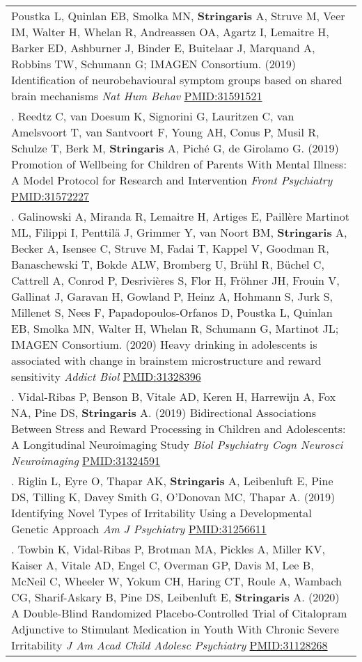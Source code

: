 \documentclass[
]{article}
\begin{document}
\begin{longtable}[]{@{}
  >{\raggedright\arraybackslash}p{}@{}}
Poustka L, Quinlan EB, Smolka MN, \textbf{Stringaris} A, Struve M, Veer
IM, Walter H, Whelan R, Andreassen OA, Agartz I, Lemaitre H, Barker ED,
Ashburner J, Binder E, Buitelaar J, Marquand A, Robbins TW, Schumann G;
IMAGEN Consortium. (2019) Identification of neurobehavioural symptom
groups based on shared brain mechanisms \emph{Nat Hum Behav}
\url{PMID:31591521} \\
81. Reedtz C, van Doesum K, Signorini G, Lauritzen C, van Amelsvoort T,
van Santvoort F, Young AH, Conus P, Musil R, Schulze T, Berk M,
\textbf{Stringaris} A, Piché G, de Girolamo G. (2019) Promotion of
Wellbeing for Children of Parents With Mental Illness: A Model Protocol
for Research and Intervention \emph{Front Psychiatry}
\url{PMID:31572227} \\
82. Galinowski A, Miranda R, Lemaitre H, Artiges E, Paillère Martinot
ML, Filippi I, Penttilä J, Grimmer Y, van Noort BM, \textbf{Stringaris}
A, Becker A, Isensee C, Struve M, Fadai T, Kappel V, Goodman R,
Banaschewski T, Bokde ALW, Bromberg U, Brühl R, Büchel C, Cattrell A,
Conrod P, Desrivières S, Flor H, Fröhner JH, Frouin V, Gallinat J,
Garavan H, Gowland P, Heinz A, Hohmann S, Jurk S, Millenet S, Nees F,
Papadopoulos-Orfanos D, Poustka L, Quinlan EB, Smolka MN, Walter H,
Whelan R, Schumann G, Martinot JL; IMAGEN Consortium. (2020) Heavy
drinking in adolescents is associated with change in brainstem
microstructure and reward sensitivity \emph{Addict Biol}
\url{PMID:31328396} \\
83. Vidal-Ribas P, Benson B, Vitale AD, Keren H, Harrewijn A, Fox NA,
Pine DS, \textbf{Stringaris} A. (2019) Bidirectional Associations
Between Stress and Reward Processing in Children and Adolescents: A
Longitudinal Neuroimaging Study \emph{Biol Psychiatry Cogn Neurosci
Neuroimaging} \url{PMID:31324591} \\
84. Riglin L, Eyre O, Thapar AK, \textbf{Stringaris} A, Leibenluft E,
Pine DS, Tilling K, Davey Smith G, O'Donovan MC, Thapar A. (2019)
Identifying Novel Types of Irritability Using a Developmental Genetic
Approach \emph{Am J Psychiatry} \url{PMID:31256611} \\
85. Towbin K, Vidal-Ribas P, Brotman MA, Pickles A, Miller KV, Kaiser A,
Vitale AD, Engel C, Overman GP, Davis M, Lee B, McNeil C, Wheeler W,
Yokum CH, Haring CT, Roule A, Wambach CG, Sharif-Askary B, Pine DS,
Leibenluft E, \textbf{Stringaris} A. (2020) A Double-Blind Randomized
Placebo-Controlled Trial of Citalopram Adjunctive to Stimulant
Medication in Youth With Chronic Severe Irritability \emph{J Am Acad
Child Adolesc Psychiatry} \url{PMID:31128268} \\

\end{longtable}
\end{document}
